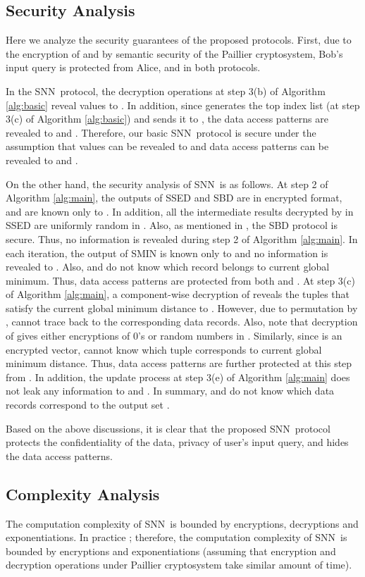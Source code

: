 \documentclass{article}
\newcommand{\sknnb}{SNN}
\newcommand{\sknnm}{SNN}
\begin{document}
\subsection{Security Analysis} 
Here we analyze the security guarantees of the proposed protocols. First, 
due to the encryption of  and by semantic security 
of the Paillier cryptosystem, Bob's input query  is protected from 
Alice,  and  in both protocols. 

In the \sknnb~protocol, 
the decryption operations at step 3(b) of Algorithm \ref{alg:basic} 
reveal  values to . In addition, since  generates the top  index list (at 
step 3(c) of Algorithm \ref{alg:basic}) and sends it to , the data access patterns are revealed 
to  and . Therefore, our basic \sknnb~protocol is secure under 
the assumption that  values can be revealed to  and 
data access patterns can be revealed to  and . 

On the other hand, the security analysis of \sknnm~is as follows. At step 2 of Algorithm \ref{alg:main}, 
the outputs of SSED and SBD are in encrypted format, and are 
known only to . In addition, all the intermediate results decrypted  
by  in SSED are uniformly random in . Also, 
as mentioned in \cite{bksam-asiaccs13}, the SBD protocol is secure. Thus, 
no information is revealed during step 2 of Algorithm \ref{alg:main}. In each 
iteration, the output of SMIN is known only to  and no information 
is revealed to . Also,  and  do not know which record belongs 
to current global minimum. Thus, data access patterns are protected 
from both  and . At step 3(c) of Algorithm \ref{alg:main}, a component-wise decryption 
of  reveals the tuples that satisfy the current global minimum 
distance to . However, due to permutation by ,  cannot trace back 
to the corresponding data records. Also, note that decryption 
of  gives either encryptions of 0's or random numbers in . 
Similarly, since  is an encrypted 
vector,  cannot know which tuple corresponds to current global minimum distance. 
Thus, data access patterns are further protected at this step from . In addition, 
the update process at step 3(e) of Algorithm \ref{alg:main} does not leak any information 
to  and . In summary,  and  do not know which data records correspond  
to the output set .

Based on the above discussions, it is clear that the proposed \sknnm~protocol 
protects the confidentiality of the data, privacy of user's input query, and hides 
the data access patterns.

\subsection{Complexity Analysis}\label{sec:complexity}
The computation complexity of \sknnb~is bounded by  encryptions, decryptions and 
exponentiations. In practice ; therefore, the computation complexity of 
\sknnb~is bounded by  encryptions and exponentiations (assuming that encryption and decryption 
operations under Paillier cryptosystem take similar amount of time). 
\end{document}
